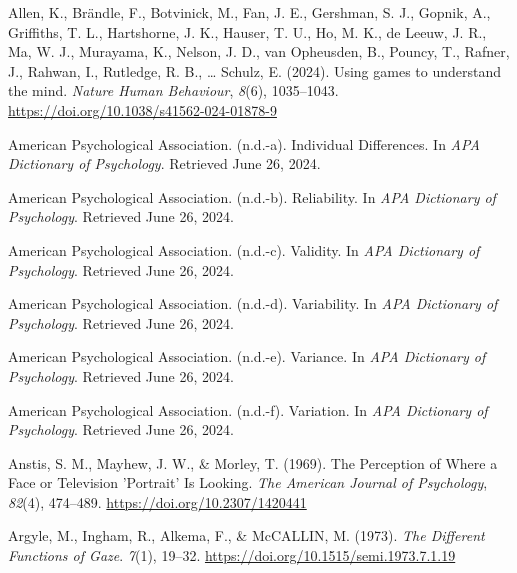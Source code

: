 \documentclass[
]{scrbook}
\newlength{\cslhangindent}
\newenvironment{CSLReferences}[2] %
 {\begin{list}{}{%
  \setlength{\itemindent}{0pt}
  \setlength{\leftmargin}{0pt}
  \setlength{\parsep}{0pt}
  \ifodd #1
   \setlength{\leftmargin}{\cslhangindent}
   \setlength{\itemindent}{-1\cslhangindent}
  \fi
  \setlength{\itemsep}{#2\baselineskip}}}
 {\end{list}}
\begin{document}
\label{refs}
\begin{CSLReferences}{1}{0}
Allen, K., Brändle, F., Botvinick, M., Fan, J. E., Gershman, S. J., Gopnik, A., Griffiths, T. L., Hartshorne, J. K., Hauser, T. U., Ho, M. K., de Leeuw, J. R., Ma, W. J., Murayama, K., Nelson, J. D., van Opheusden, B., Pouncy, T., Rafner, J., Rahwan, I., Rutledge, R. B., \ldots{} Schulz, E. (2024). Using games to understand the mind. \emph{Nature Human Behaviour}, \emph{8}(6), 1035--1043. \url{https://doi.org/10.1038/s41562-024-01878-9}

American Psychological Association. (n.d.-a). Individual {Differences}. In \emph{APA Dictionary of Psychology}. Retrieved June 26, 2024.

American Psychological Association. (n.d.-b). Reliability. In \emph{APA Dictionary of Psychology}. Retrieved June 26, 2024.

American Psychological Association. (n.d.-c). Validity. In \emph{APA Dictionary of Psychology}. Retrieved June 26, 2024.

American Psychological Association. (n.d.-d). Variability. In \emph{APA Dictionary of Psychology}. Retrieved June 26, 2024.

American Psychological Association. (n.d.-e). Variance. In \emph{APA Dictionary of Psychology}. Retrieved June 26, 2024.

American Psychological Association. (n.d.-f). Variation. In \emph{APA Dictionary of Psychology}. Retrieved June 26, 2024.

Anstis, S. M., Mayhew, J. W., \& Morley, T. (1969). The {Perception} of {Where} a {Face} or {Television} '{Portrait}' {Is Looking}. \emph{The American Journal of Psychology}, \emph{82}(4), 474--489. \url{https://doi.org/10.2307/1420441}

Argyle, M., Ingham, R., Alkema, F., \& McCALLIN, M. (1973). \emph{The {Different Functions} of {Gaze}}. \emph{7}(1), 19--32. \url{https://doi.org/10.1515/semi.1973.7.1.19}


\end{CSLReferences}
\end{document}
